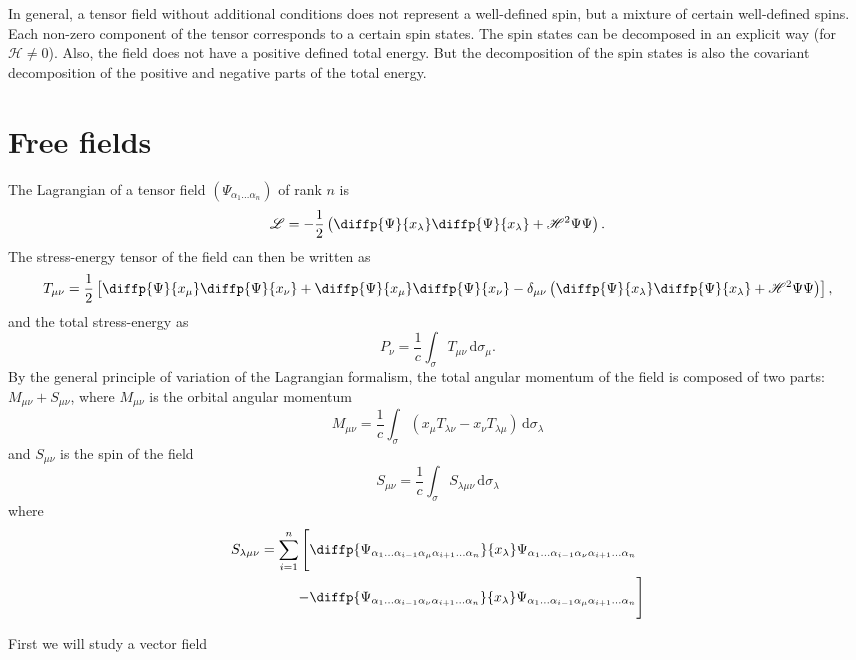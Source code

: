 \documentclass{article}
\newcommand{\HH}{\mathscr{H}}
\newcommand{\LL}{\mathscr{L}}
\renewcommand{\d}{\,\mathrm{d}}
\newcommand{\oldpage}[1]{\marginpar{\footnotesize$\Big\vert$ \textit{p.~#1}}}
\begin{document}
In general, a tensor field without additional conditions does not represent a well-defined spin, but a mixture of certain well-defined spins.
Each non-zero component of the tensor corresponds to a certain spin states.
The spin states can be decomposed in an explicit way (for $\HH\neq0$).
Also, the field does not have a positive defined total energy.
But the decomposition of the spin states is also the covariant decomposition of the positive and negative parts of the total energy.


\section{Free fields}
\label{section1}

The Lagrangian of a tensor field $(\Psi_{\alpha_1\ldots\alpha_n})$ of rank $n$ is
\[
  \LL = -\frac12\left(
    \diffp{\Psi}{{x_\lambda}} \diffp{\Psi}{{x_\lambda}} + \HH^2\Psi\Psi
  \right).
\]
The stress-energy tensor of the field can then be written as
\[
  T_{\mu\nu} = \frac12\left[
    \diffp{\Psi}{{x_\mu}} \diffp{\Psi}{{x_\nu}}
    + \diffp{\Psi}{{x_\mu}} \diffp{\Psi}{{x_\nu}}
    -\delta_{\mu\nu}\left(
      \diffp{\Psi}{{x_\lambda}} \diffp{\Psi}{{x_\lambda}} + \HH^2\Psi\Psi
    \right)
  \right],
\]
and the total stress-energy as
\[
  P_\nu = \frac1c \int_\sigma T_{\mu\nu}\d\sigma_\mu.
\]
By the general principle of variation of the Lagrangian formalism, the total angular momentum of the field is composed of two parts: $M_{\mu\nu}+S_{\mu\nu}$, where $M_{\mu\nu}$ is the orbital angular momentum
\[
  M_{\mu\nu} = \frac1c \int_\sigma (x_\mu T_{\lambda\nu} - x_\nu T_{\lambda\mu}) \d\sigma_\lambda
\]
and $S_{\mu\nu}$ is the spin of the field
\[
  S_{\mu\nu} = \frac1c \int_\sigma S_{\lambda\mu\nu} \d\sigma_\lambda
\]
where
\begin{align*}
  S_{\lambda\mu\nu} = \sum_{i=1}^n \Bigg[
    &\diffp{{\Psi_{\alpha_1\ldots\alpha_{i-1}\alpha_\mu\alpha_{i+1}\ldots\alpha_n}}}{{x_\lambda}} \Psi_{\alpha_1\ldots\alpha_{i-1}\alpha_\nu\alpha_{i+1}\ldots\alpha_n}
    \\-&
    \diffp{{\Psi_{\alpha_1\ldots\alpha_{i-1}\alpha_\nu\alpha_{i+1}\ldots\alpha_n}}}{{x_\lambda}} \Psi_{\alpha_1\ldots\alpha_{i-1}\alpha_\mu\alpha_{i+1}\ldots\alpha_n}
  \Bigg]
\end{align*}

\oldpage{13-03}
First we will study a vector field
\end{document}
